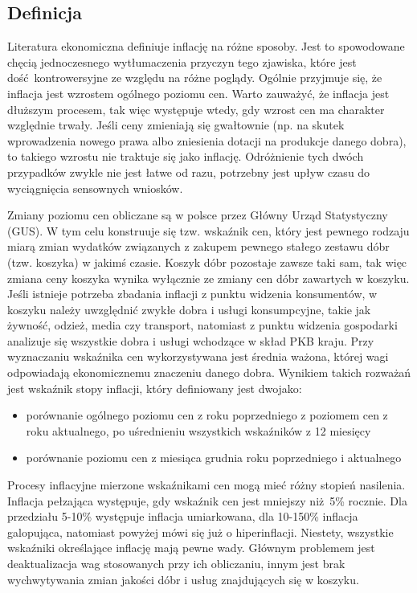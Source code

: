 \documentclass[12pt]{extarticle}
\begin{document}
\subsection{Definicja}

Literatura ekonomiczna definiuje inflację na różne sposoby. Jest to spowodowane chęcią jednoczesnego wytłumaczenia przyczyn tego zjawiska, które jest dość kontrowersyjne ze względu na różne poglądy. Ogólnie przyjmuje się, że inflacja jest wzrostem ogólnego poziomu cen. Warto zauważyć, że inflacja jest dłuższym procesem, tak więc występuje wtedy, gdy wzrost cen ma charakter względnie trwały. Jeśli ceny zmieniają się gwałtownie (np. na skutek wprowadzenia nowego prawa albo zniesienia dotacji na produkcje danego dobra), to takiego wzrostu nie traktuje się jako inflację. Odróżnienie tych dwóch przypadków zwykle nie jest łatwe od razu, potrzebny jest upływ czasu do wyciągnięcia sensownych wniosków.

Zmiany poziomu cen obliczane są w polsce przez Główny Urząd Statystyczny (GUS). W tym celu konstruuje się tzw. wskaźnik cen, który jest pewnego rodzaju miarą zmian wydatków związanych z zakupem pewnego stałego zestawu dóbr (tzw. koszyka) w jakimś czasie. Koszyk dóbr pozostaje zawsze taki sam, tak więc zmiana ceny koszyka wynika wyłącznie ze zmiany cen dóbr zawartych w koszyku. Jeśli istnieje potrzeba zbadania inflacji z punktu widzenia konsumentów, w koszyku należy uwzględnić zwykłe dobra i usługi konsumpcyjne, takie jak żywność, odzież, media czy transport, natomiast z punktu widzenia gospodarki analizuje się wszystkie dobra i usługi wchodzące w skład PKB kraju. Przy wyznaczaniu wskaźnika cen wykorzystywana jest średnia ważona, której wagi odpowiadają ekonomicznemu znaczeniu danego dobra. Wynikiem takich rozważań jest wskaźnik stopy inflacji, który definiowany jest dwojako: 

\begin{itemize}
	\item porównanie ogólnego poziomu cen z roku poprzedniego z poziomem cen z roku aktualnego, po uśrednieniu wszystkich wskaźników z 12 miesięcy
    \item porównanie poziomu cen z miesiąca grudnia roku poprzedniego i aktualnego
\end{itemize}

Procesy inflacyjne mierzone wskaźnikami cen mogą mieć różny stopień nasilenia. Inflacja pełzająca występuje, gdy wskaźnik cen jest mniejszy niż 5\% rocznie. Dla przedziału 5-10\% występuje inflacja umiarkowana, dla 10-150\% inflacja galopująca, natomiast powyżej mówi się już o hiperinflacji. Niestety, wszystkie wskaźniki określające inflację mają pewne wady. Głównym problemem jest deaktualizacja wag stosowanych przy ich obliczaniu, innym jest brak wychwytywania zmian jakości dóbr i usług znajdujących się w koszyku.
\end{document}
